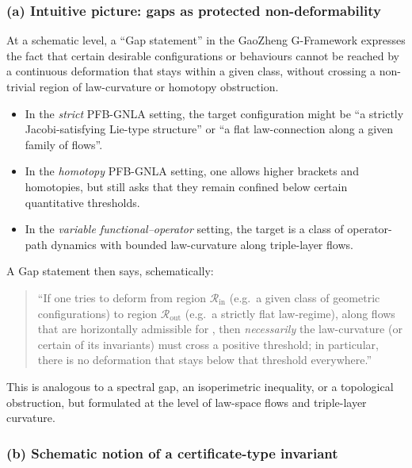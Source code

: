 \documentclass[11pt]{book}
\theoremstyle{plain}
\theoremstyle{definition}
\begin{document}
\subsubsection*{(a) Intuitive picture: gaps as protected non-deformability}

At a schematic level, a “Gap statement” in the GaoZheng G-Framework
expresses the fact that certain desirable configurations or behaviours
cannot be reached by a continuous deformation that stays within a
given class, without crossing a non-trivial region of law-curvature or
homotopy obstruction.

\begin{itemize}
  \item In the \emph{strict} PFB-GNLA setting, the target configuration
        might be “a strictly Jacobi-satisfying Lie-type structure” or
        “a flat law-connection along a given family of flows”.
  \item In the \emph{homotopy} PFB-GNLA setting, one allows higher
        brackets and homotopies, but still asks that they remain
        confined below certain quantitative thresholds.
  \item In the \emph{variable functional–operator} setting, the target
        is a class of operator-path dynamics with bounded law-curvature
        along triple-layer flows.
\end{itemize}

A Gap statement then says, schematically:

\begin{quote}
  “If one tries to deform from region $\mathcal{R}_{\mathrm{in}}$
  (e.g.\ a given class of geometric configurations) to region
  $\mathcal{R}_{\mathrm{out}}$ (e.g.\ a strictly flat law-regime),
  along flows that are horizontally admissible for \GZTLC, then
  \emph{necessarily} the law-curvature (or certain of its invariants)
  must cross a positive threshold; in particular, there is no
  deformation that stays below that threshold everywhere.”
\end{quote}

This is analogous to a spectral gap, an isoperimetric inequality, or a
topological obstruction, but formulated at the level of law-space flows
and triple-layer curvature.



\subsubsection*{(b) Schematic notion of a certificate-type invariant}
\end{document}
